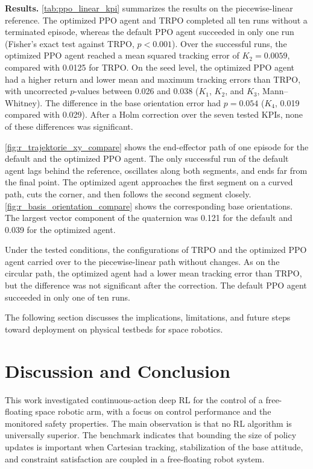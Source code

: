 \documentclass{ieeeaccess}
\begin{document}
\textbf{Results.} \cref{tab:ppo_linear_kpi} summarizes the results on the piecewise-linear reference. The
optimized PPO agent and TRPO completed all ten runs without a terminated episode, whereas the default PPO
agent succeeded in only one run (Fisher's exact test against TRPO, $p < 0.001$). Over the successful runs,
the optimized PPO agent reached a mean squared tracking error of $K_2 = 0.0059$, compared with 0.0125 for
TRPO. On the seed level, the optimized PPO agent had a higher return and lower mean and maximum tracking
errors than TRPO, with uncorrected $p$-values between 0.026 and 0.038 ($K_1$, $K_2$, and $K_3$,
Mann--Whitney). The difference in the base orientation error had $p = 0.054$ ($K_4$, 0.019 compared with
0.029). After a Holm correction over the seven tested KPIs, none of these differences was significant.

\cref{fig:r_trajektorie_xy_compare} shows the end-effector path of one episode for the default and the
optimized PPO agent. The only successful run of the default agent lags behind the reference, oscillates
along both segments, and ends far from the final point. The optimized agent approaches the first segment on
a curved path, cuts the corner, and then follows the second segment closely.
\cref{fig:r_basis_orientation_compare} shows the corresponding base orientations. The largest vector
component of the quaternion was 0.121 for the default and 0.039 for the optimized agent.

Under the tested conditions, the configurations of TRPO and the optimized PPO agent carried over to the
piecewise-linear path without changes. As on the circular path, the optimized agent had a lower mean
tracking error than TRPO, but the difference was not significant after the correction. The default PPO
agent succeeded in only one of ten runs.

The following section discusses the implications, limitations, and future steps toward deployment on physical
testbeds for space robotics.

\section{Discussion and Conclusion}\label{sec:discussion} This work investigated continuous-action deep
RL for the control of a free-floating space robotic arm, with a focus on control performance and the
monitored safety properties. The main observation is that no RL algorithm is universally superior. The
benchmark indicates that bounding the size of policy updates is important when Cartesian tracking,
stabilization of the base attitude, and constraint satisfaction are coupled in a free-floating robot
system.
\end{document}
